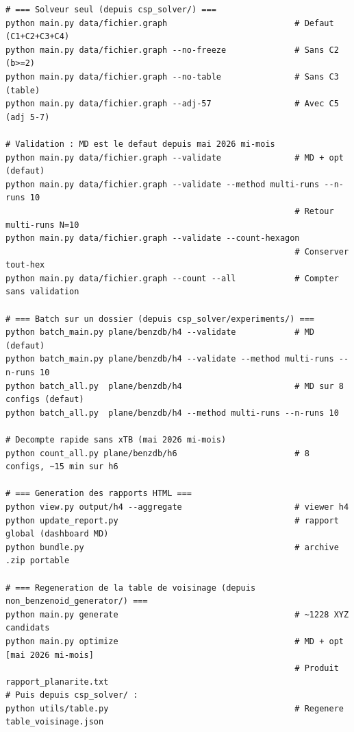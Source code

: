 \begin{lstlisting}[style=benzai]
# === Solveur seul (depuis csp_solver/) ===
python main.py data/fichier.graph                          # Defaut (C1+C2+C3+C4)
python main.py data/fichier.graph --no-freeze              # Sans C2 (b>=2)
python main.py data/fichier.graph --no-table               # Sans C3 (table)
python main.py data/fichier.graph --adj-57                 # Avec C5 (adj 5-7)

# Validation : MD est le defaut depuis mai 2026 mi-mois
python main.py data/fichier.graph --validate               # MD + opt (defaut)
python main.py data/fichier.graph --validate --method multi-runs --n-runs 10
                                                           # Retour multi-runs N=10
python main.py data/fichier.graph --validate --count-hexagon
                                                           # Conserver tout-hex
python main.py data/fichier.graph --count --all            # Compter sans validation

# === Batch sur un dossier (depuis csp_solver/experiments/) ===
python batch_main.py plane/benzdb/h4 --validate            # MD (defaut)
python batch_main.py plane/benzdb/h4 --validate --method multi-runs --n-runs 10
python batch_all.py  plane/benzdb/h4                       # MD sur 8 configs (defaut)
python batch_all.py  plane/benzdb/h4 --method multi-runs --n-runs 10

# Decompte rapide sans xTB (mai 2026 mi-mois)
python count_all.py plane/benzdb/h6                        # 8 configs, ~15 min sur h6

# === Generation des rapports HTML ===
python view.py output/h4 --aggregate                       # viewer h4
python update_report.py                                    # rapport global (dashboard MD)
python bundle.py                                           # archive .zip portable

# === Regeneration de la table de voisinage (depuis non_benzenoid_generator/) ===
python main.py generate                                    # ~1228 XYZ candidats
python main.py optimize                                    # MD + opt [mai 2026 mi-mois]
                                                           # Produit rapport_planarite.txt
# Puis depuis csp_solver/ :
python utils/table.py                                      # Regenere table_voisinage.json
\end{lstlisting}
